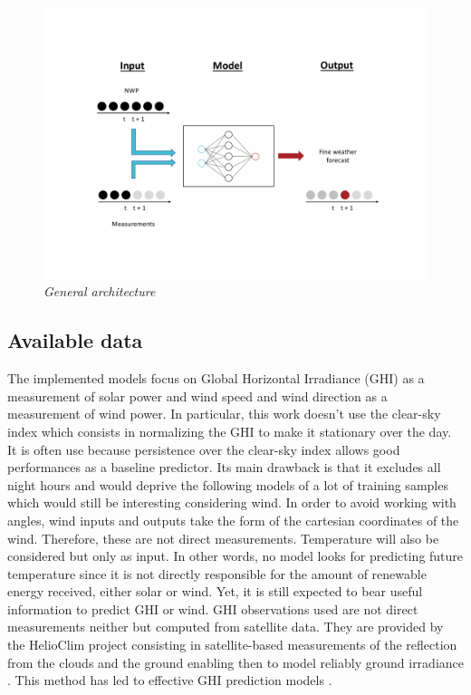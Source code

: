 \documentclass{article}
\begin{document}

\vspace{-30px}

\begin{figure}[H]
    \centering
    \includegraphics[width=\linewidth]{img/structure.pdf}
    \vspace{-30px}
    \caption{\textit{General architecture}}
   \label{fig:Fig. 1}
\end{figure}

\subsection*{Available data}

The implemented models focus on Global Horizontal Irradiance (GHI) as a measurement of solar power
and wind speed and wind direction as a measurement of wind power.
In particular, this work doesn't use the clear-sky index which consists in normalizing the GHI to make it
stationary over the day. It is often use because persistence over the clear-sky index allows good performances
as a baseline predictor. Its main drawback is that it excludes all night hours and would deprive the following models
of a lot of training samples which would still be interesting considering wind.
In order to avoid working with angles, wind inputs and outputs
take the form of the cartesian coordinates of the wind. Therefore, these are not direct measurements. Temperature will
also be considered but only as input. In other words, no model looks for predicting future temperature since it is
not directly responsible for the amount of renewable energy received, either solar or wind. Yet, it is still expected to
bear useful information to predict GHI or wind. GHI observations used are not direct measurements neither but
computed from satellite data. They are provided by the HelioClim project consisting in satellite-based measurements
of the reflection from the clouds and the ground enabling then to model reliably ground irradiance
\cite{blanc_helioclim_2011}. This method has led to effective GHI prediction models
\cite{linares-rodriguez_artificial_2013, mazorra_aguiar_use_2015}.
\end{document}
